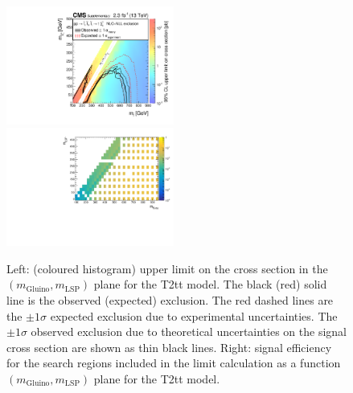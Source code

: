 \begin{figure}[t]
  \begin{center}
    \includegraphics[width=0.49\textwidth]{supplementary/figures/RA1T2ttXSEC} \, 
    \includegraphics[width=0.49\textwidth]{supplementary/figures/T2tt_merging_4_cats} \,     
  \end{center}
  \caption{Left: (coloured histogram) upper limit on the cross section in the $(m_{\mathrm{Gluino}},m_{\mathrm{LSP}})$ plane for the T2tt model. 
  The black (red) solid line is the observed (expected) exclusion. The red dashed lines are the $\pm1\sigma$ expected exclusion due to experimental uncertainties. 
  The $\pm1\sigma$ observed exclusion due to theoretical uncertainties on the signal cross section are shown as thin black lines. 
  Right: signal efficiency for the search regions included in the limit calculation as a function $(m_{\mathrm{Gluino}},m_{\mathrm{LSP}})$ plane for the T2tt model. 
  \label{fig:T2tt_excl}}
\end{figure}



